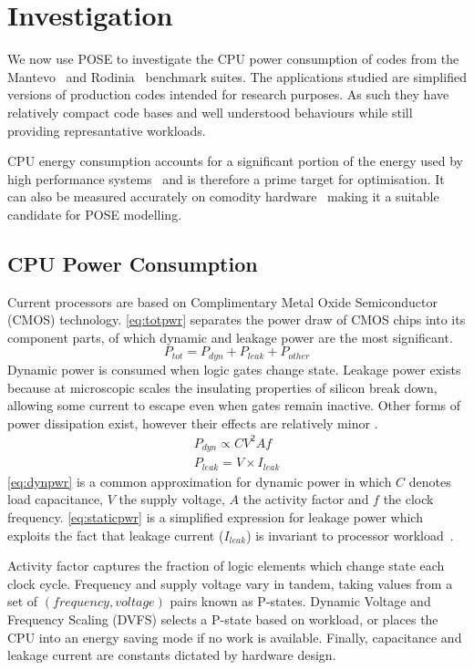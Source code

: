 \section{Investigation}
\label{sec:investigation}
We now use POSE to investigate the CPU power consumption of codes from the Mantevo~\cite{heroux:2009aa} and Rodinia~\cite{che:2009aa} benchmark suites.
The applications studied are simplified versions of production codes intended for research purposes.
As such they have relatively compact code bases and well understood behaviours while still providing represantative workloads.

CPU energy consumption accounts for a significant portion of the energy used by high performance systems~\cite{rong:2010aa} and is therefore a prime target for optimisation.
It can also be measured accurately on comodity hardware~\cite{hackenberg:2013aa} making it a suitable candidate for POSE modelling.

\subsection{CPU Power Consumption}
\label{ssec:cpupower}
Current processors are based on Complimentary Metal Oxide Semiconductor (CMOS) technology.
\autoref{eq:totpwr} separates the power draw of CMOS chips into its component parts, of which dynamic and leakage power are the most significant.
\begin{equation}
\label{eq:totpwr}
P_{tot} = P_{dyn} + P_{leak} + P_{other}
\end{equation}
Dynamic power is consumed when logic gates change state.
Leakage power exists because at microscopic scales the insulating properties of silicon break down, allowing some current to escape even when gates remain inactive.
Other forms of power dissipation exist, however their effects are relatively minor \cite{kaxiras:2008aa}.
\begin{gather}
P_{dyn} \propto CV^{2}Af \label{eq:dynpwr} \\
P_{leak} = V\times I_{leak} \label{eq:staticpwr}
\end{gather}
\autoref{eq:dynpwr} is a common approximation for dynamic power in which $C$ denotes load capacitance, $V$ the supply voltage, $A$ the activity factor and $f$ the clock frequency.
\autoref{eq:staticpwr} is a simplified expression for leakage power which exploits the fact that leakage current ($I_{leak}$) is invariant to processor workload~\cite{kim:2003aa}.

Activity factor captures the fraction of logic elements which change state each clock cycle.
Frequency and supply voltage vary in tandem, taking values from a set of $(frequency, voltage)$ pairs known as P-states.
Dynamic Voltage and Frequency Scaling (DVFS) selects a P-state based on workload, or places the CPU into an energy saving mode if no work is available.
Finally, capacitance and leakage current are constants dictated by hardware design.

